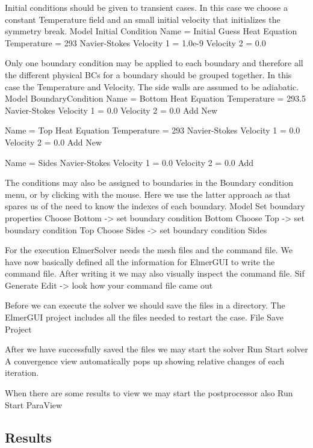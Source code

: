 Initial conditions should be given to transient cases. In this case we choose a 
constant Temperature field and an small initial velocity that initializes the symmetry break. 
\ttbegin
Model
  Initial Condition 
    Name = Initial Guess
    Heat Equation
      Temperature = 293
    Navier-Stokes
      Velocity 1 = 1.0e-9
      Velocity 2 = 0.0
\ttend

Only one boundary condition may be applied to each boundary and therefore all the 
different physical BCs for a boundary should be grouped together. In this case the
Temperature and Velocity. The side walls are assumed to be adiabatic.
\ttbegin
Model
  BoundaryCondition
    Name = Bottom
    Heat Equation
      Temperature = 293.5
    Navier-Stokes 
      Velocity 1 = 0.0
      Velocity 2 = 0.0
    Add
    New

    Name = Top
    Heat Equation
      Temperature = 293
    Navier-Stokes 
      Velocity 1 = 0.0
      Velocity 2 = 0.0
    Add 
    New
 
    Name = Sides
    Navier-Stokes 
      Velocity 1 = 0.0
      Velocity 2 = 0.0
    Add
\ttend   

The conditions may also be assigned to boundaries in the Boundary condition menu, or 
by clicking with the mouse. Here we use the latter approach as that spares us of the 
need to know the indexes of each boundary.
\ttbegin
Model
  Set boundary properties
    Choose Bottom -> set boundary condition Bottom
    Choose Top -> set boundary condition Top
    Choose Sides -> set boundary condition Sides
\ttend

For the execution ElmerSolver needs the mesh files and the command file. 
We have now basically defined all the information for ElmerGUI to write 
the command file. After writing it we may also visually inspect the command file.
\ttbegin
Sif 
  Generate
  Edit -> look how your command file came out  
\ttend

Before we can execute the solver we should save the files in a directory. 
The ElmerGUI project includes all the files needed to restart the case.
\ttbegin
File 
  Save Project
\ttend

After we have successfully saved the files we may start the solver
\ttbegin
Run
  Start solver
\ttend
A convergence view automatically pops up showing relative changes of each iteration.

When there are some results to view we may start the postprocessor also
\ttbegin
Run
  Start ParaView
\ttend


\subsection*{Results}


